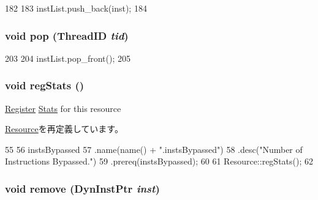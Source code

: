 \begin{DoxyCode}
182 {
183     instList.push_back(inst);
184 }
\end{DoxyCode}
\hypertarget{classInstBuffer_af6dbebba7f0784a65a148c6f06f7106d}{
\subsubsection[{pop}]{\setlength{\rightskip}{0pt plus 5cm}void pop ({\bf ThreadID} {\em tid})}}
\label{classInstBuffer_af6dbebba7f0784a65a148c6f06f7106d}



\begin{DoxyCode}
203 {
204     instList.pop_front();
205 }
\end{DoxyCode}
\hypertarget{classInstBuffer_a4dc637449366fcdfc4e764cdf12d9b11}{
\subsubsection[{regStats}]{\setlength{\rightskip}{0pt plus 5cm}void regStats ()}}
\label{classInstBuffer_a4dc637449366fcdfc4e764cdf12d9b11}
\hyperlink{classRegister}{Register} \hyperlink{namespaceStats}{Stats} for this resource 

\hyperlink{classResource_ac1739a9be0fbd5d96cf441cd3b2c1c78}{Resource}を再定義しています。


\begin{DoxyCode}
55 {
56     instsBypassed
57         .name(name() + ".instsBypassed")
58         .desc("Number of Instructions Bypassed.")
59         .prereq(instsBypassed);    
60 
61     Resource::regStats();
62 }
\end{DoxyCode}
\hypertarget{classInstBuffer_a21558187a079b60fba92c9c66725f051}{
\subsubsection[{remove}]{\setlength{\rightskip}{0pt plus 5cm}void remove ({\bf DynInstPtr} {\em inst})}}
\label{classInstBuffer_a21558187a079b60fba92c9c66725f051}



